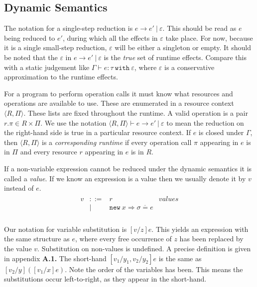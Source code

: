\documentclass[a4paper,UKenglish]{lipics-v2016}
\newcommand{\kw}[1]{\mathtt{ #1 }~}
\newcommand{\kwa}[1]{\mathtt{ #1 }}
\newcommand{\rctx}[0]{ \langle R, \Pi \rangle }
\begin{document}
\subsection{Dynamic Semantics}

The notation for a single-step reduction is $e \longrightarrow e'~|~\varepsilon$. This should be read as $e$ being reduced to $e'$, during which all the effects in $\varepsilon$ take place. For now, because it is a single small-step reduction, $\varepsilon$ will be either a singleton or empty. It should be noted that the $\varepsilon$ in $e \longrightarrow e'~|~\varepsilon$ is the \textit{true} set of runtime effects. Compare this with a static judgement like $\Gamma \vdash e: \tau~\kw{with} \varepsilon$, where $\varepsilon$ is a conservative approximation to the runtime effects.

For a program to perform operation calls it must know what resources and operations are available to use. These are enumerated in a resource context $ \langle R, \Pi \rangle$. These lists are fixed throughout the runtime. A valid operation is a pair $r.\pi \in R \times \Pi$. We use the notation $\langle R, \Pi \rangle \vdash e \longrightarrow e'~|~\varepsilon$ to mean the reduction on the right-hand side is true in a particular resource context. If $e$ is closed under $\Gamma$, then $\rctx$ is a \textit{corresponding runtime} if every operation call $\pi$ appearing in $e$ is in $\Pi$ and every resource $r$ appearing in $e$ is in $R$.

If a non-variable expression cannot be reduced under the dynamic semantics it is called a \textit{value}. If we know an expression is a value then we usually denote it by $v$ instead of $e$.
\[
\begin{array}{lll}

\begin{array}{lllr}

v & ::= & r & values \\
		& | & \kwa{new}~x \Rightarrow \overline{\sigma = e} \\

\end{array}
\end{array}
\]

\noindent
Our notation for variable substitution is $[v/z]e$. This yields an expression with the same structure as $e$, where every free occurrence of $z$ has been replaced by the value $v$. Substitution on non-values is undefined. A precise definition is given in appendix \textbf{A.1.} The short-hand $[v_1/y_1, v_2/y_2]e$ is the same as $[v_2/y]([v_1/x]e)$. Note the order of the variables has been. This means the substitutions occur left-to-right, as they appear in the short-hand.
\end{document}
